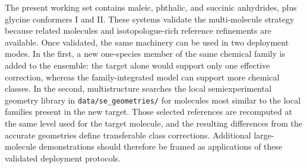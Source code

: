 \documentclass[journal=jpclcd,manuscript=letter,etalmode=truncate,chaptertitle=true]{achemso}
\begin{document}
The present working set contains maleic, phthalic, and succinic anhydrides, plus glycine conformers I and II.  These systems validate the multi-molecule strategy because related molecules and isotopologue-rich reference refinements are available.  Once validated, the same machinery can be used in two deployment modes.  In the first, a new one-species member of the same chemical family is added to the ensemble: the target alone would support only one effective correction, whereas the family-integrated model can support more chemical classes.  In the second, multistructure searches the local semiexperimental geometry library in \texttt{data/se\_geometries/} for molecules most similar to the local families present in the new target.  Those selected references are recomputed at the same level used for the target molecule, and the resulting differences from the accurate geometries define transferable class corrections.  Additional large-molecule demonstrations should therefore be framed as applications of these validated deployment protocols.


\end{document}
